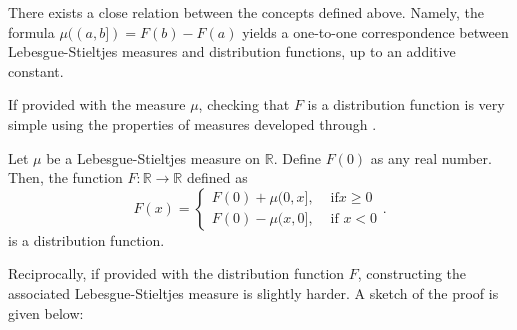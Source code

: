 There exists a close relation between the concepts defined above.
Namely, the formula \(\mu((a,b])=F(b)-F(a)\) yields a one-to-one correspondence
between Lebesgue-Stieltjes measures and distribution functions, up to an
additive constant. 

If provided with the measure \(\mu\), checking that \(F\) is a distribution function is very simple using the properties
of measures developed through .

\begin{prop} Let \(\mu\) be a Lebesgue-Stieltjes measure on \(\mathbb{R}\). Define \(F(0)\) as any real number. Then, the function \(F\colon\mathbb{R}\to\mathbb{R}\) defined as
	\[F(x)= \left\{
	\begin{array}{rl} F(0)+\mu(0,x],& \text{ if
} x\geq0\\ F(0)-\mu(x,0],& \text{ if } x<0
	\end{array}.  \right.
	\] is a distribution function.
\end{prop}

Reciprocally, if provided with the distribution function \(F\), constructing the associated Lebesgue-Stieltjes measure is slightly harder. A sketch of the proof is given below:

